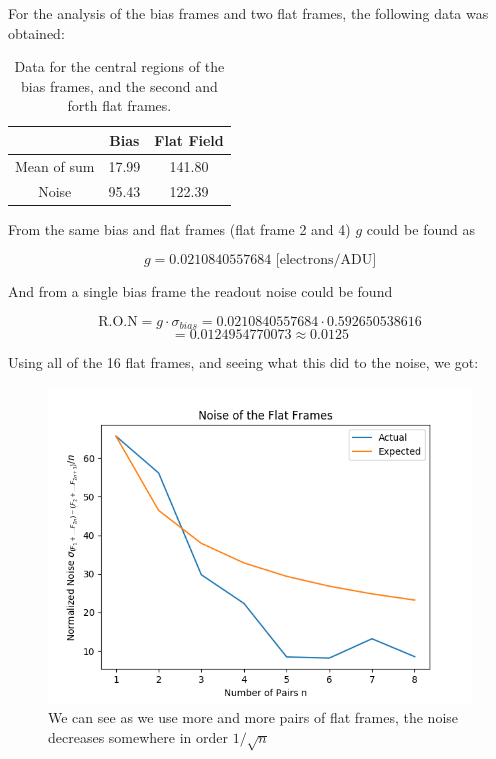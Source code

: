 \documentclass{emulateapj}
\begin{document}
For the analysis of the bias frames and two flat frames, the following data was obtained:

\begin{table}[H]
\centering
\begin{tabular}{c|c|c}
  & Bias & Flat Field \\
  \hline
Mean of sum & 17.99 & 141.80\\
Noise & 95.43 & 122.39
\end{tabular}
\caption{Data for the central regions of the bias frames, and the second and forth flat frames.}
\label{tab:biasFlat}
\end{table}


From the same bias and flat frames (flat frame 2 and 4) $g$ could be found as

\begin{equation}
g = 0.0210840557684  \text{ [electrons/ADU]}
\label{eq:gVal}
\end{equation}

And from a single bias frame the readout noise could be found

\begin{equation}
\text{R.O.N} = g\cdot\sigma_{bias} = 0.0210840557684\cdot0.592650538616 
\end{equation}
\begin{equation}
= 0.0124954770073 \approx 0.0125
\end{equation}


Using all of the 16 flat frames, and seeing what this did to the noise, we got:

\begin{figure}[H]
\centering
\includegraphics[scale=0.4]{noisePairs.png}
\caption{We can see as we use more and more pairs of flat frames, the noise decreases somewhere in order $1/\sqrt{n}$}
\label{img:noisePairs}
\end{figure}
\end{document}
